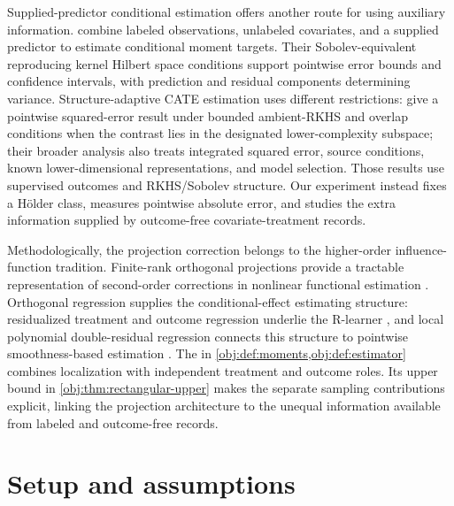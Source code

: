 \documentclass[11pt]{article}
\begin{document}
Supplied-predictor conditional estimation offers another route for using auxiliary information. \citet[Sections 2.4 and 3 and Theorems 1--3]{SuiZhouZhouDai2026} combine labeled observations, unlabeled covariates, and a supplied predictor to estimate conditional moment targets. Their Sobolev-equivalent reproducing kernel Hilbert space conditions support pointwise error bounds and confidence intervals, with prediction and residual components determining variance. Structure-adaptive CATE estimation uses different restrictions: \citet[Sections 2.3 and 6, Corollary 4]{Kim2026StructureAdaptiveCATE} give a pointwise squared-error result under bounded ambient-RKHS and overlap conditions when the contrast lies in the designated lower-complexity subspace; their broader analysis also treats integrated squared error, source conditions, known lower-dimensional representations, and model selection. Those results use supervised outcomes and RKHS/Sobolev structure. Our experiment instead fixes a H\"older class, measures pointwise absolute error, and studies the extra information supplied by outcome-free covariate-treatment records.

Methodologically, the projection correction belongs to the higher-order influence-function tradition. Finite-rank orthogonal projections provide a tractable representation of second-order corrections in nonlinear functional estimation \citep[Lemma 3]{Robins2009}. Orthogonal regression supplies the conditional-effect estimating structure: residualized treatment and outcome regression underlie the R-learner \citep[Section 1]{Nie2021}, and local polynomial double-residual regression connects this structure to pointwise smoothness-based estimation \citep[Theorem 3]{Kennedy2023}. The  in \cref{obj:def:moments,obj:def:estimator} combines localization with independent treatment and outcome roles. Its upper bound in \cref{obj:thm:rectangular-upper} makes the separate sampling contributions explicit, linking the projection architecture to the unequal information available from labeled and outcome-free records.


\section{Setup and assumptions}\label{sec:setup}
\end{document}
